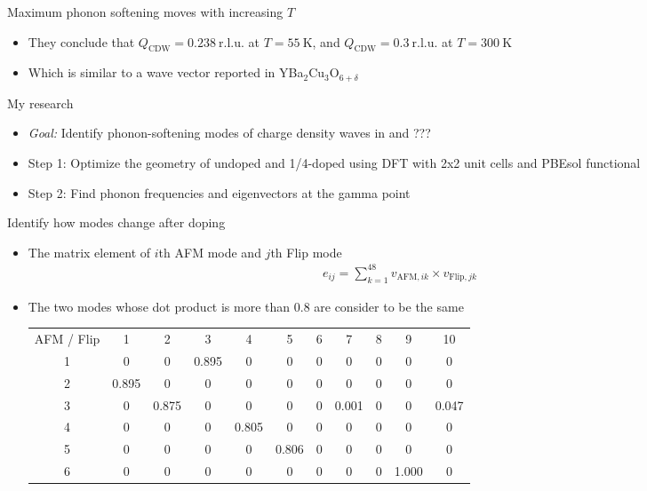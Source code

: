 \documentclass{beamer}
\begin{document}
\begin{frame}{Maximum phonon softening moves with increasing $T$}
\begin{itemize}
\item They conclude that $Q_{\text{CDW}} = 0.238~\mathrm{r.l.u.}$ at $T = 55~\mathrm{K}$, and $Q_{\text{CDW}} = 0.3~\mathrm{r.l.u.}$ at $T = 300~\mathrm{K}$
\item Which is similar to a wave vector reported in YBa$_2$Cu$_3$O$_{6 + \delta}$
\end{itemize}
\end{frame}

\begin{frame}{My research}
\begin{itemize}
\item \textit{Goal:} Identify phonon-softening modes of charge density waves in  and ???
\item Step 1: Optimize the geometry of undoped and 1/4-doped  using DFT with 2x2 unit cells and PBEsol functional
\item Step 2: Find phonon frequencies and eigenvectors at the gamma point
\end{itemize}
\end{frame}

\begin{frame}{Identify how modes change after doping}
\begin{itemize}
\item The matrix element of $i$th AFM mode and $j$th Flip mode
\begin{align}
e_{ij} = \sum_{k = 1}^{48} v_{\text{AFM}, ik} \times v_{\text{Flip}, jk}
\end{align}
\item The two modes whose dot product is more than 0.8 are consider to be the same
\begin{table}
\begin{tabular}{ccccccccccc}
AFM / Flip & 1 & 2 & 3 & 4 & 5 & 6 & 7 & 8 & 9 & 10 \\
1 & 0 & 0 & 0.895 & 0 & 0 & 0 & 0 & 0 & 0 & 0 \\
2 & 0.895 & 0 & 0 & 0 & 0 & 0 & 0 & 0 & 0 & 0 \\
3 & 0 & 0.875 & 0 & 0 & 0 & 0 & 0.001 & 0 & 0 & 0.047 \\
4 & 0 & 0 & 0 & 0.805 & 0 & 0 & 0 & 0 & 0 & 0 \\
5 & 0 & 0 & 0 & 0 & 0.806 & 0 & 0 & 0 & 0 & 0 \\
6 & 0 & 0 & 0 & 0 & 0 & 0 & 0 & 0 & 1.000 & 0 \\
\end{tabular}
\end{table}
\end{itemize}
\end{frame}
\end{document}
